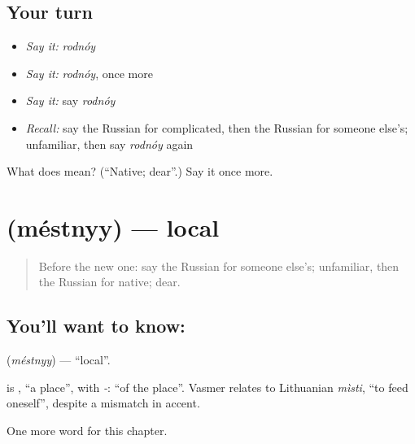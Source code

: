 \subsection*{Your turn}
\begin{itemize}
\raggedright
  \item \emph{Say it:} \emph{rodnóy}
  \item \emph{Say it:} \emph{rodnóy}, once more
  \item \emph{Say it:} say \emph{rodnóy}
  \item \emph{Recall:} say the Russian for complicated, then the Russian for someone else's; unfamiliar, then say \emph{rodnóy} again
\end{itemize}

\begin{tcolorbox}[breakable,colback=teal!4,colframe=teal!35!black,title={Before you move on}]
What does  mean? (\textquotedblleft{}Native; dear\textquotedblright{}.) Say it once more.
\end{tcolorbox}
\section[\texorpdfstring{\ru{местный} (méstnyy)}{местный (méstnyy)}]{ (méstnyy) — local}

\label{lesson:RU-C189-mestnyy}



\begin{quote}
Before the new one: say the Russian for someone else's; unfamiliar, then the Russian for native; dear.
\end{quote}

\subsection*{You'll want to know: }
\textbf{} (\emph{méstnyy}) — \textquotedblleft{}local\textquotedblright{}.

\begin{cousinweb}
\textbf{} is \emph{}, \textquotedblleft{}a place\textquotedblright{}, with \emph{-}: \textquotedblleft{}of the place\textquotedblright{}. Vasmer relates \emph{} to Lithuanian \emph{mìsti}, \textquotedblleft{}to feed oneself\textquotedblright{}, despite a mismatch in accent.
\end{cousinweb}

\begin{grammarlens}[title={What you've built}]
One more word for this chapter.
\end{grammarlens}

